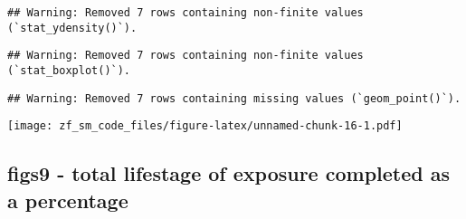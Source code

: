 \documentclass[
]{article}
\begin{document}
\begin{verbatim}
## Warning: Removed 7 rows containing non-finite values (`stat_ydensity()`).
\end{verbatim}

\begin{verbatim}
## Warning: Removed 7 rows containing non-finite values (`stat_boxplot()`).
\end{verbatim}

\begin{verbatim}
## Warning: Removed 7 rows containing missing values (`geom_point()`).
\end{verbatim}

\texttt{[image: zf\_sm\_code\_files/figure-latex/unnamed-chunk-16-1.pdf]}

\hypertarget{figs9---total-lifestage-of-exposure-completed-as-a-percentage}{%
\subsection{figs9 - total lifestage of exposure completed as a
percentage}\label{figs9---total-lifestage-of-exposure-completed-as-a-percentage}}
\end{document}
